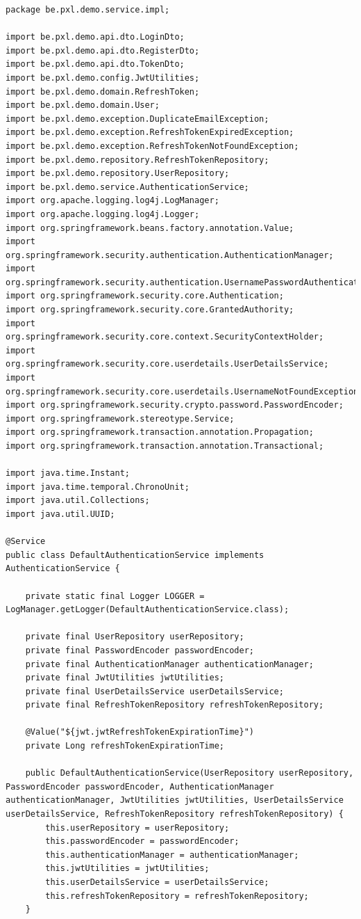 \begin{lstlisting}
package be.pxl.demo.service.impl;

import be.pxl.demo.api.dto.LoginDto;
import be.pxl.demo.api.dto.RegisterDto;
import be.pxl.demo.api.dto.TokenDto;
import be.pxl.demo.config.JwtUtilities;
import be.pxl.demo.domain.RefreshToken;
import be.pxl.demo.domain.User;
import be.pxl.demo.exception.DuplicateEmailException;
import be.pxl.demo.exception.RefreshTokenExpiredException;
import be.pxl.demo.exception.RefreshTokenNotFoundException;
import be.pxl.demo.repository.RefreshTokenRepository;
import be.pxl.demo.repository.UserRepository;
import be.pxl.demo.service.AuthenticationService;
import org.apache.logging.log4j.LogManager;
import org.apache.logging.log4j.Logger;
import org.springframework.beans.factory.annotation.Value;
import org.springframework.security.authentication.AuthenticationManager;
import org.springframework.security.authentication.UsernamePasswordAuthenticationToken;
import org.springframework.security.core.Authentication;
import org.springframework.security.core.GrantedAuthority;
import org.springframework.security.core.context.SecurityContextHolder;
import org.springframework.security.core.userdetails.UserDetailsService;
import org.springframework.security.core.userdetails.UsernameNotFoundException;
import org.springframework.security.crypto.password.PasswordEncoder;
import org.springframework.stereotype.Service;
import org.springframework.transaction.annotation.Propagation;
import org.springframework.transaction.annotation.Transactional;

import java.time.Instant;
import java.time.temporal.ChronoUnit;
import java.util.Collections;
import java.util.UUID;

@Service
public class DefaultAuthenticationService implements AuthenticationService {

    private static final Logger LOGGER = LogManager.getLogger(DefaultAuthenticationService.class);

    private final UserRepository userRepository;
    private final PasswordEncoder passwordEncoder;
    private final AuthenticationManager authenticationManager;
    private final JwtUtilities jwtUtilities;
    private final UserDetailsService userDetailsService;
    private final RefreshTokenRepository refreshTokenRepository;

    @Value("${jwt.jwtRefreshTokenExpirationTime}")
    private Long refreshTokenExpirationTime;

    public DefaultAuthenticationService(UserRepository userRepository, PasswordEncoder passwordEncoder, AuthenticationManager authenticationManager, JwtUtilities jwtUtilities, UserDetailsService userDetailsService, RefreshTokenRepository refreshTokenRepository) {
        this.userRepository = userRepository;
        this.passwordEncoder = passwordEncoder;
        this.authenticationManager = authenticationManager;
        this.jwtUtilities = jwtUtilities;
        this.userDetailsService = userDetailsService;
        this.refreshTokenRepository = refreshTokenRepository;
    }



\end{lstlisting}
